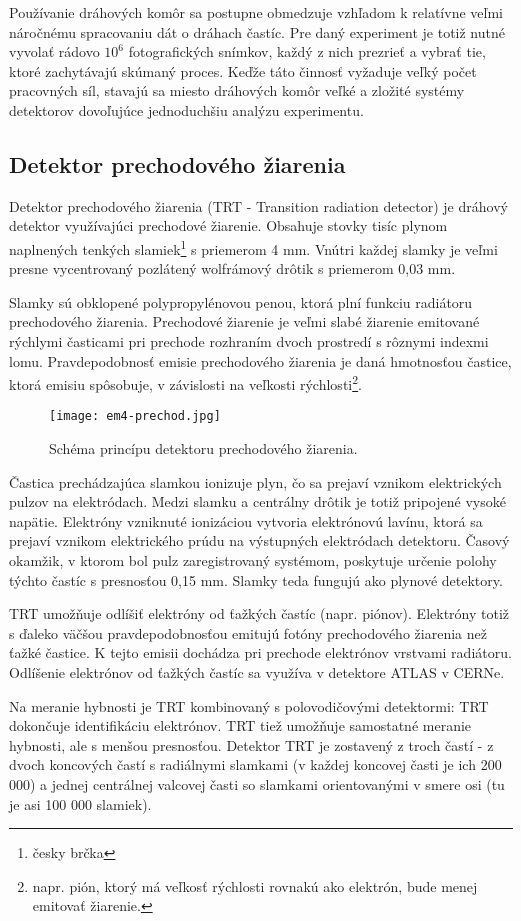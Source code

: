 \documentclass[../../main.tex]{subfiles}
\begin{document}
Používanie dráhových komôr sa postupne obmedzuje vzhľadom k relatívne veľmi náročnému spracovaniu dát o dráhach častíc. Pre daný experiment je totiž nutné vyvolať rádovo $10^6$ fotografických snímkov, každý z nich prezrieť a vybrať tie, ktoré zachytávajú skúmaný proces. Keďže táto činnosť vyžaduje veľký počet pracovných síl, stavajú sa miesto dráhových komôr veľké a zložité systémy detektorov dovoľujúce jednoduchšiu analýzu experimentu.


\subsection{Detektor prechodového žiarenia}

Detektor prechodového žiarenia (TRT - Transition radiation detector) je dráhový detektor využívajúci prechodové žiarenie. Obsahuje stovky tisíc plynom naplnených tenkých slamiek\footnote{česky brčka} s priemerom 4 mm. Vnútri každej slamky je veľmi presne vycentrovaný pozlátený wolfrámový drôtik s priemerom 0,03 mm.

Slamky sú obklopené polypropylénovou penou, ktorá plní funkciu radiátoru prechodového žiarenia. Prechodové žiarenie je veľmi slabé žiarenie emitované rýchlymi časticami pri prechode rozhraním dvoch prostredí s rôznymi indexmi lomu. Pravdepodobnosť emisie prechodového žiarenia je daná hmotnosťou častice, ktorá emisiu spôsobuje, v závislosti na veľkosti rýchlosti\footnote{napr. pión, ktorý má veľkosť rýchlosti rovnakú ako elektrón, bude menej emitovať žiarenie.}.

\begin{figure}[h]
\centering
\texttt{[image: em4-prechod.jpg]}
\caption{Schéma princípu detektoru prechodového žiarenia.}
\label{em4:img:prechod}
\end{figure}

Častica prechádzajúca slamkou ionizuje plyn, čo sa prejaví vznikom elektrických pulzov na elektródach. Medzi slamku a centrálny drôtik je totiž pripojené vysoké napätie. Elektróny vzniknuté ionizáciou vytvoria elektrónovú lavínu, ktorá sa prejaví vznikom elektrického prúdu na výstupných elektródach detektoru. Časový okamžik, v ktorom bol pulz zaregistrovaný systémom, poskytuje určenie polohy týchto častíc s presnosťou 0,15 mm. Slamky teda fungujú ako plynové detektory.

TRT umožňuje odlíšiť elektróny od ťažkých častíc (napr. piónov). Elektróny totiž s ďaleko väčšou pravdepodobnosťou emitujú fotóny prechodového žiarenia než ťažké častice. K tejto emisii dochádza pri prechode elektrónov vrstvami radiátoru. Odlíšenie elektrónov od ťažkých častíc sa využíva v detektore ATLAS v CERNe.

Na meranie hybnosti je TRT kombinovaný s polovodičovými detektormi: TRT dokončuje identifikáciu elektrónov. TRT tiež umožňuje samostatné meranie hybnosti, ale s menšou presnosťou. Detektor TRT je zostavený z troch častí - z dvoch koncových častí s radiálnymi slamkami (v každej koncovej časti je ich 200 000) a jednej centrálnej valcovej časti so slamkami orientovanými v smere osi (tu je asi 100 000 slamiek). 
\end{document}
